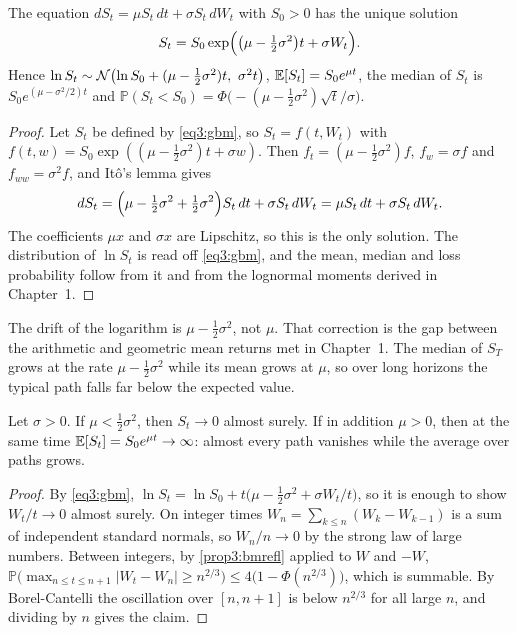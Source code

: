 \begin{chapterrefs}
\begin{proposition}\label{prop3:gbm}
The equation $dS_t=\mu S_t\,dt+\sigma S_t\,dW_t$ with $S_0>0$ has the unique solution
\begin{equation}\label{eq3:gbm}
  S_t = S_0\exp\Bigl(\bigl(\mu-\tfrac12\sigma^2\bigr)t+\sigma W_t\Bigr).
\end{equation}
Hence $\ln S_t\sim\N\bigl(\ln S_0+(\mu-\tfrac12\sigma^2)t,\ \sigma^2t\bigr)$, $\mathbb{E}[S_t]=S_0e^{\mu t}$,
the median of $S_t$ is $S_0e^{(\mu-\sigma^2/2)t}$ and $\mathbb P(S_t<S_0)=\Phi\bigl(-(\mu-\tfrac12\sigma^2)\sqrt t/\sigma\bigr)$.
\end{proposition}

\begin{proof}
Let $S_t$ be defined by \cref{eq3:gbm}, so $S_t=f(t,W_t)$ with
$f(t,w)=S_0\exp((\mu-\tfrac12\sigma^2)t+\sigma w)$. Then $f_t=(\mu-\tfrac12\sigma^2)f$, $f_w=\sigma f$ and
$f_{ww}=\sigma^2f$, and It\^o's lemma gives
\begin{equation*}
  dS_t = \Bigl(\mu-\tfrac12\sigma^2+\tfrac12\sigma^2\Bigr)S_t\,dt+\sigma S_t\,dW_t = \mu S_t\,dt+\sigma S_t\,dW_t .
\end{equation*}
The coefficients $\mu x$ and $\sigma x$ are Lipschitz, so this is the only solution. The distribution of
$\ln S_t$ is read off \cref{eq3:gbm}, and the mean, median and loss probability follow from it and from
the lognormal moments derived in Chapter~1.
\end{proof}

The drift of the logarithm is $\mu-\tfrac12\sigma^2$, not $\mu$. That correction is the gap between the
arithmetic and geometric mean returns met in Chapter~1. The median of $S_T$ grows at the rate $\mu-\tfrac12\sigma^2$
while its mean grows at $\mu$, so over long horizons the typical path falls far below the expected
value.

\begin{proposition}\label{prop3:gbmlong}
Let $\sigma>0$. If $\mu<\tfrac12\sigma^2$, then $S_t\to0$ almost surely. If in addition $\mu>0$, then at the same
time $\mathbb{E}[S_t]=S_0e^{\mu t}\to\infty$: almost every path vanishes while the average over paths grows.
\end{proposition}

\begin{proof}
By \cref{eq3:gbm}, $\ln S_t=\ln S_0+t\bigl(\mu-\tfrac12\sigma^2+\sigma W_t/t\bigr)$, so it is enough to show
$W_t/t\to0$ almost surely. On integer times $W_n=\sum_{k\le n}(W_k-W_{k-1})$ is a sum of independent
standard normals, so $W_n/n\to0$ by the strong law of large numbers. Between integers, by
\cref{prop3:bmrefl} applied to $W$ and $-W$,
$\mathbb P\bigl(\max_{n\le t\le n+1}|W_t-W_n|\ge n^{2/3}\bigr)\le4\bigl(1-\Phi(n^{2/3})\bigr)$, which is summable. By
Borel-Cantelli the oscillation over $[n,n+1]$ is below $n^{2/3}$ for all large $n$, and dividing by
$n$ gives the claim.
\end{proof}


\end{chapterrefs}
